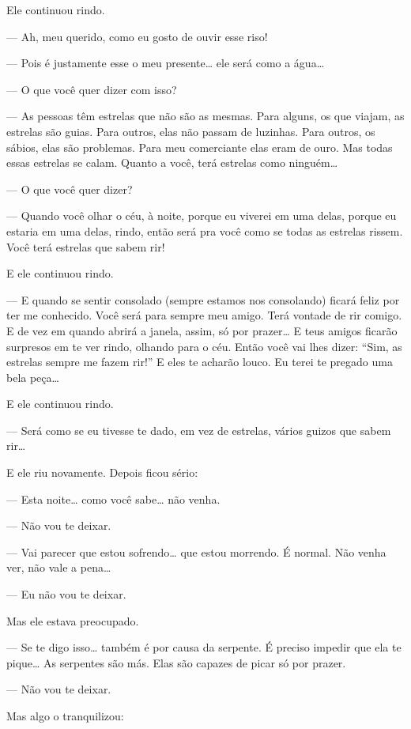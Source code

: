 \begin{Parallel}[p]{}{}
{Ele continuou rindo.

--- Ah, meu querido, como eu gosto de ouvir esse riso!

--- Pois é justamente esse o meu presente\ldots{} ele será como a água\ldots{}

--- O que você quer dizer com isso?

--- As pessoas têm estrelas que não são as mesmas. Para alguns, os que
viajam, as estrelas são guias. Para outros, elas não passam de luzinhas.
Para outros, os sábios, elas são problemas. Para meu comerciante elas
eram de ouro. Mas todas essas estrelas se calam. Quanto a você, terá
estrelas como ninguém\ldots{}

--- O que você quer dizer?

--- Quando você olhar o céu, à noite, porque eu viverei em uma delas,
porque eu estaria em uma delas, rindo, então será pra você como se todas
as estrelas rissem. Você terá estrelas que sabem rir!

E ele continuou rindo.

--- E quando se sentir consolado (sempre estamos nos consolando) ficará
feliz por ter me conhecido. Você será para sempre meu amigo. Terá
vontade de rir comigo. E de vez em quando abrirá a janela, assim, só por
prazer\ldots{} E teus amigos ficarão surpresos em te ver rindo, olhando para
o céu. Então você vai lhes dizer: ``Sim, as estrelas sempre me fazem
rir!'' E eles te acharão louco. Eu terei te pregado uma bela peça\ldots{}

E ele continuou rindo.

--- Será como se eu tivesse te dado, em vez de estrelas, vários guizos que
sabem rir\ldots{}

E ele riu novamente. Depois ficou sério:

--- Esta noite\ldots{} como você sabe\ldots{} não venha.

--- Não vou te deixar.

--- Vai parecer que estou sofrendo\ldots{} que estou morrendo. É normal. Não
venha ver, não vale a pena\ldots{}

--- Eu não vou te deixar.

Mas ele estava preocupado.

--- Se te digo isso\ldots{} também é por causa da serpente. É preciso impedir
que ela te pique\ldots{} As serpentes são más. Elas são capazes de picar só
por prazer.

--- Não vou te deixar.

Mas algo o tranquilizou:

}
\end{Parallel}
